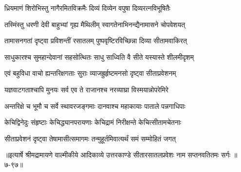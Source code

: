 \twolineshloka
{ध्रियमाणं शिरोभिस्तु नागैरमितविक्रमैः}
{दिव्यं दिव्येन वपुषा दिव्यरत्नविभूषितैः} %

\twolineshloka
{तस्मिंस्तु धरणी देवी बाहुभ्यां गृह्य मैथिलीम्}
{स्वागतेनाभिनन्द्यैनामासने चोपवेशयत्} %

\twolineshloka
{तामासनगतां दृष्ट्वा प्रविशन्तीं रसातलम्}
{पुष्पवृष्टिरविच्छिन्ना दिव्या सीतामवाकिरत्} %

\twolineshloka
{साधुकारश्च सुमहान्देवानां सहसोत्थितः}
{साधु साध्विति वै सीते यस्यास्ते शीलमीदृशम्} %

\twolineshloka
{एवं बहुविधा वाचो ह्यन्तरिक्षगताः सुराः}
{व्याजह्रुर्हृष्टमनसो दृष्ट्वा सीताप्रवेशनम्} %

\twolineshloka
{यज्ञवाटगताश्चापि मुनयः सर्व एव ते}
{राजानश्च नरव्याघ्रा विस्मयान्नोपरेमिरे} %

\twolineshloka
{अन्तरिक्षे च भूमौ च सर्वे स्थावरजङ्गमाः}
{दानवाश्च महाकायाः पाताले पन्नगाधिपाः} %

\twolineshloka
{केचिद्विनेदुः संहृष्टाः केचिद्ध्यानपरायणाः}
{केचिद्रामं निरीक्षन्ते केचित्सीतामचेतनाः} %

\twolineshloka
{सीताप्रवेशनं दृष्ट्वा तेषामासीत्समागमः}
{तन्मुहूर्तमिवात्यर्थं समं सम्मोहितं जगत्} %


॥इत्यार्षे श्रीमद्रामायणे वाल्मीकीये आदिकाव्ये उत्तरकाण्डे सीतारसातलप्रवेशः नाम सप्तनवतितमः सर्गः ॥७-९७॥
